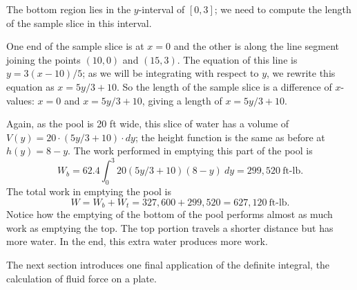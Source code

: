 \begin{example}
The bottom region lies in the $y$-interval of $[0,3]$; we need to compute the length of the sample slice in this interval.

One end of the sample slice is at $x=0$ and the other is along the line segment joining the points $(10,0)$ and $(15,3)$. The equation of this line is $y= 3(x-10)/5$; as we will be integrating with respect to $y$, we rewrite this equation as $x=5y/3+10$. So the length of the sample slice is a difference of $x$-values: $x=0$ and $x=5y/3+10$, giving a length of $x=5y/3+10$. 

Again, as the pool is 20 ft wide, this slice of water has a volume of $V(y) = 20\cdot(5y/3+10)\cdot dy$; the height function is the same as before at $h(y)=8-y$. The work performed in emptying this part of the pool is
\[W_b = 62.4\int_0^3 20(5y/3+10)(8-y)\ dy = 299,520\ \text{ft-lb}.\]
The total work in emptying the pool is 
\[W = W_b+W_t = 327,600+299,520 = 627,120\ \text{ft-lb}.\]
Notice how the emptying of the bottom of the pool performs almost as much work as emptying the top. The top portion travels a shorter distance but has more water. In the end, this extra water produces more work.
\end{example}

The next section introduces one final application of the definite integral, the calculation of fluid force on a plate.

